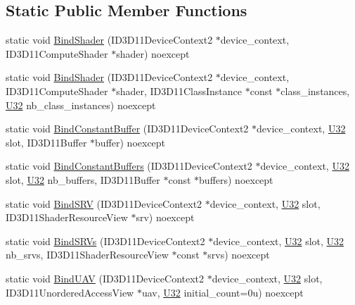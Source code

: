 \subsection*{Static Public Member Functions}
\begin{DoxyCompactItemize}
\item 
static void \hyperlink{structmage_1_1_pipeline_1_1_c_s_aa18771d857f202536fb911be03e69169}{Bind\+Shader} (I\+D3\+D11\+Device\+Context2 $\ast$device\+\_\+context, I\+D3\+D11\+Compute\+Shader $\ast$shader) noexcept
\item 
static void \hyperlink{structmage_1_1_pipeline_1_1_c_s_a33158eaf6089d9e0af90791ac7a095ab}{Bind\+Shader} (I\+D3\+D11\+Device\+Context2 $\ast$device\+\_\+context, I\+D3\+D11\+Compute\+Shader $\ast$shader, I\+D3\+D11\+Class\+Instance $\ast$const $\ast$class\+\_\+instances, \hyperlink{namespacemage_a41c104c036fba3756a74e19f793eeaa1}{U32} nb\+\_\+class\+\_\+instances) noexcept
\item 
static void \hyperlink{structmage_1_1_pipeline_1_1_c_s_a4c4045bc8cf532dd98f8a4325cf3b6e0}{Bind\+Constant\+Buffer} (I\+D3\+D11\+Device\+Context2 $\ast$device\+\_\+context, \hyperlink{namespacemage_a41c104c036fba3756a74e19f793eeaa1}{U32} slot, I\+D3\+D11\+Buffer $\ast$buffer) noexcept
\item 
static void \hyperlink{structmage_1_1_pipeline_1_1_c_s_a4e4c9831facc0940013d98f0c6d13f3f}{Bind\+Constant\+Buffers} (I\+D3\+D11\+Device\+Context2 $\ast$device\+\_\+context, \hyperlink{namespacemage_a41c104c036fba3756a74e19f793eeaa1}{U32} slot, \hyperlink{namespacemage_a41c104c036fba3756a74e19f793eeaa1}{U32} nb\+\_\+buffers, I\+D3\+D11\+Buffer $\ast$const $\ast$buffers) noexcept
\item 
static void \hyperlink{structmage_1_1_pipeline_1_1_c_s_a6e41d1385377c2684dd78a85cc5ec582}{Bind\+S\+RV} (I\+D3\+D11\+Device\+Context2 $\ast$device\+\_\+context, \hyperlink{namespacemage_a41c104c036fba3756a74e19f793eeaa1}{U32} slot, I\+D3\+D11\+Shader\+Resource\+View $\ast$srv) noexcept
\item 
static void \hyperlink{structmage_1_1_pipeline_1_1_c_s_af815686c949f425f65a2ff2e4e8ad74e}{Bind\+S\+R\+Vs} (I\+D3\+D11\+Device\+Context2 $\ast$device\+\_\+context, \hyperlink{namespacemage_a41c104c036fba3756a74e19f793eeaa1}{U32} slot, \hyperlink{namespacemage_a41c104c036fba3756a74e19f793eeaa1}{U32} nb\+\_\+srvs, I\+D3\+D11\+Shader\+Resource\+View $\ast$const $\ast$srvs) noexcept
\item 
static void \hyperlink{structmage_1_1_pipeline_1_1_c_s_af74dd2cda257497abc1963810fb94d7e}{Bind\+U\+AV} (I\+D3\+D11\+Device\+Context2 $\ast$device\+\_\+context, \hyperlink{namespacemage_a41c104c036fba3756a74e19f793eeaa1}{U32} slot, I\+D3\+D11\+Unordered\+Access\+View $\ast$uav, \hyperlink{namespacemage_a41c104c036fba3756a74e19f793eeaa1}{U32} initial\+\_\+count=0u) noexcept

\end{DoxyCompactItemize}
